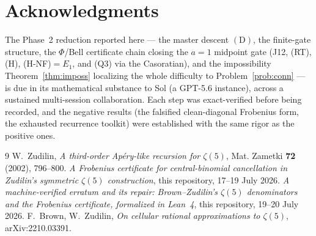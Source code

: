\documentclass[11pt]{article}
\theoremstyle{definition}
\begin{document}
\section*{Acknowledgments}

The Phase~2 reduction reported here --- the master descent $(\mathrm D)$, the
finite-gate structure, the $\Phi$/Bell certificate chain closing the $a=1$
midpoint gate (J12, (RT), (H), (H-NF)$=E_1$, and (Q3) via the Casoratian),
and the impossibility Theorem~\ref{thm:imposs} localizing the whole difficulty
to Problem~\ref{prob:conn} --- is due in its mathematical substance to Sol
(a GPT-5.6 instance), across a sustained multi-session collaboration. Each
step was exact-verified before being recorded, and the negative results (the
falsified clean-diagonal Frobenius form, the exhausted recurrence toolkit)
were established with the same rigor as the positive ones.

\begin{thebibliography}{9}
 W.~Zudilin, \emph{A third-order Ap\'ery-like recursion for
$\zeta(5)$}, Mat. Zametki \textbf{72} (2002), 796--800.
 \emph{A Frobenius certificate for central-binomial
cancellation in Zudilin's symmetric $\zeta(5)$ construction}, this repository,
17--19 July 2026.
 \emph{A machine-verified erratum and its repair: Brown--Zudilin's
$\zeta(5)$ denominators and the Frobenius certificate, formalized in Lean~4},
this repository, 19--20 July 2026.
 F.~Brown, W.~Zudilin, \emph{On cellular rational
approximations to $\zeta(5)$}, arXiv:2210.03391.
\end{thebibliography}
\end{document}
